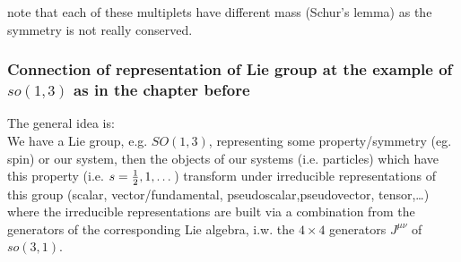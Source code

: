 note that each of these multiplets have different mass (Schur's lemma) as the symmetry is not really conserved.












\subsubsection{Connection of representation of Lie group at the example of $so(1,3)$ as in the chapter before}
The general idea is:\\
We have a Lie group, e.g. $SO(1,3)$, representing some property/symmetry (eg. spin) or our system, then the objects of our systems (i.e. particles) which have this property (i.e. $s=\frac{1}{2},1,\dots$) transform under irreducible representations of this group (scalar, vector/fundamental, pseudoscalar,pseudovector, tensor,\dots) where the irreducible representations are built via a combination from the generators of the corresponding Lie algebra, i.w. the $4\times 4$ generators $J^{\mu \nu}$ of $so(3,1)$.\\
\\


